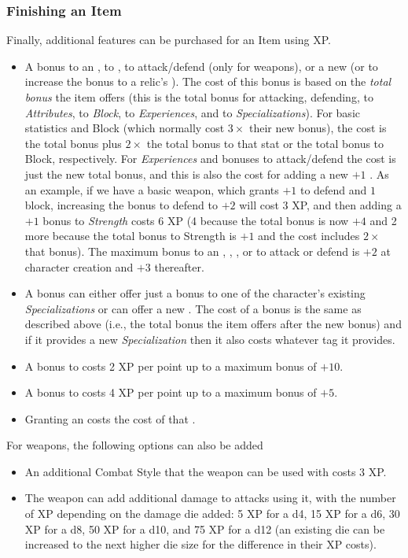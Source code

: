 \subsubsection{Finishing an Item}
Finally, additional features can be purchased for an Item using XP.
\begin{itemize}
  \item A bonus to an \Attribute{}, to \Block{}, to attack/defend (only for weapons), or a new \Experience{} (or to increase the bonus to a relic's \Experience{}).
    The cost of this bonus is based on the \emph{total bonus} the item offers (this is the total bonus for attacking, defending, to \emph{Attributes}, to \emph{Block}, to \emph{Experiences}, and to \emph{Specializations}).
    For basic statistics and Block (which normally cost $3 \times$ their new bonus), the cost is the total bonus plus $2\times$ the total bonus to that stat or the total bonus to Block, respectively.
    For \emph{Experiences} and bonuses to attack/defend the cost is just the new total bonus, and this is also the cost for adding a new $+1$ \Experience.
    As an example, if we have a basic weapon, which grants $+1$ to defend and $1$ block, increasing the bonus to defend to $+2$ will cost $3$ XP, and then adding a $+1$ bonus to \emph{Strength} costs 6 XP (4 because the total bonus is now $+4$ and 2 more because the total bonus to Strength is $+1$ and the cost includes $2 \times$ that bonus).
    The maximum bonus to an \Attribute{}, \Block, \Experience{}, or to attack or defend is $+2$ at character creation and $+3$ thereafter.
  \item A \Specialization{} bonus can either offer just a bonus to one of the character's existing \emph{Specializations} or can offer a new \Specialization{}.
    The cost of a \Specialization{} bonus is the same as described above (i.e., the total bonus the item offers after the new bonus) and if it provides a new \emph{Specialization} then it also costs whatever tag it provides.
  \item A bonus to \Life{} costs 2 XP per point up to a maximum bonus of $+ 10$.
  \item A bonus to \Recovery{} costs 4 XP per point up to a maximum bonus of $+ 5$.
  \item Granting an \Ability{} costs the cost of that \Ability{}.
\end{itemize}
For weapons, the following options can also be added
\begin{itemize}
  \item An additional Combat Style that the weapon can be used with costs 3 XP.
  \item The weapon can add additional damage to attacks using it, with the number of XP depending on the damage die added: 5 XP for a d4, 15 XP for a d6, 30 XP for a d8, 50 XP for a d10, and 75 XP for a d12 (an existing die can be increased to the next higher die size for the difference in their XP costs).
\end{itemize}

